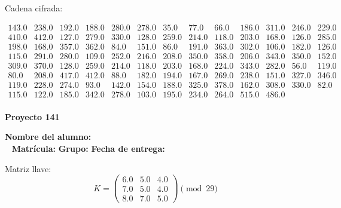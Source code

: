 \documentclass[12pt]{article}
\begin{document}
Cadena cifrada:
\begin{center}
$\begin{array}{lllllllllllll}
143.0 & 238.0 & 192.0 & 188.0 & 280.0 & 278.0 & 35.0 & 77.0 & 66.0 & 186.0 & 311.0 & 246.0 & 229.0\\
410.0 & 412.0 & 127.0 & 279.0 & 330.0 & 128.0 & 259.0 & 214.0 & 118.0 & 203.0 & 168.0 & 126.0 & 285.0\\
198.0 & 168.0 & 357.0 & 362.0 & 84.0 & 151.0 & 86.0 & 191.0 & 363.0 & 302.0 & 106.0 & 182.0 & 126.0\\
115.0 & 291.0 & 280.0 & 109.0 & 252.0 & 216.0 & 208.0 & 350.0 & 358.0 & 206.0 & 343.0 & 350.0 & 152.0\\
309.0 & 370.0 & 128.0 & 259.0 & 214.0 & 118.0 & 203.0 & 168.0 & 224.0 & 343.0 & 282.0 & 56.0 & 119.0\\
80.0 & 208.0 & 417.0 & 412.0 & 88.0 & 182.0 & 194.0 & 167.0 & 269.0 & 238.0 & 151.0 & 327.0 & 346.0\\
119.0 & 228.0 & 274.0 & 93.0 & 142.0 & 154.0 & 188.0 & 325.0 & 378.0 & 162.0 & 308.0 & 330.0 & 82.0\\
115.0 & 122.0 & 185.0 & 342.0 & 278.0 & 103.0 & 195.0 & 234.0 & 264.0 & 515.0 & 486.0\\
\end{array}$
\end{center}

\newpage


\textbf{Proyecto 141}

\textbf{Nombre del alumno:} \underline{\hspace{13cm}}\\\
\vspace{1cm}
\textbf{Matrícula:} \underline{\hspace{4cm}} \hspace{1cm}
\textbf{Grupo:} \underline{\hspace{2cm}}
\textbf{Fecha de entrega:} \underline{\hspace{2cm}}

\medskip

Matriz llave:
\[
K = \begin{pmatrix}
6.0 & 5.0 & 4.0\\
7.0 & 5.0 & 4.0\\
8.0 & 7.0 & 5.0
\end{pmatrix} \pmod{29}
\]
\end{document}
